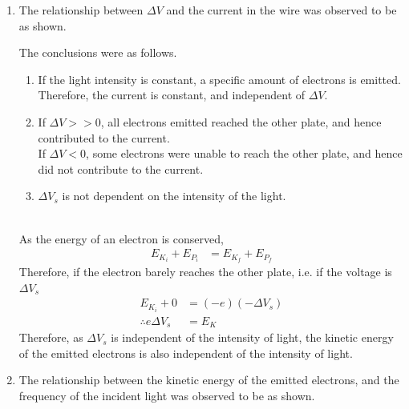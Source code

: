 \documentclass[fleqn, a4paper, 12pt, twoside]{article}
\theoremstyle{definition}
\theoremstyle{theorem}
\begin{document}
\begin{enumerate}[leftmargin=*]
	\item
		The relationship between $\Delta V$ and the current in the wire was observed to be as shown.
		\begin{figure}[H]
		\end{figure}
		The conclusions were as follows.
		\begin{enumerate}
			\item
				If the light intensity is constant, a specific amount of electrons is emitted.
				Therefore, the current is constant, and independent of $\Delta V$.\\
			\item
				If $\Delta V >> 0$, all electrons emitted reached the other plate, and hence contributed to the current.\\
				If $\Delta V < 0$, some electrons were unable to reach the other plate, and hence did not contribute to the current.
			\item
				$\Delta V_s$ is not dependent on the intensity of the light.
		\end{enumerate}
		~\\
		As the energy of an electron is conserved,
		\begin{align*}
			E_{K_i} + E_{P_i} & = E_{K_f} + E_{P_f}
		\end{align*}
		Therefore, if the electron barely reaches the other plate, i.e. if the voltage is $\Delta V_s$
		\begin{align*}
			E_{K_i} + 0             & = (-e) (-\Delta V_s) \\
			\therefore e \Delta V_s & = E_K
		\end{align*}
		Therefore, as $\Delta V_s$ is independent of the intensity of light, the kinetic energy of the emitted electrons is also independent of the intensity of light.\\
	\item
		The relationship between the kinetic energy of the emitted electrons, and the frequency of the incident light was observed to be as shown.
		\begin{figure}[H]
\end{figure}
\end{enumerate}
\end{document}
